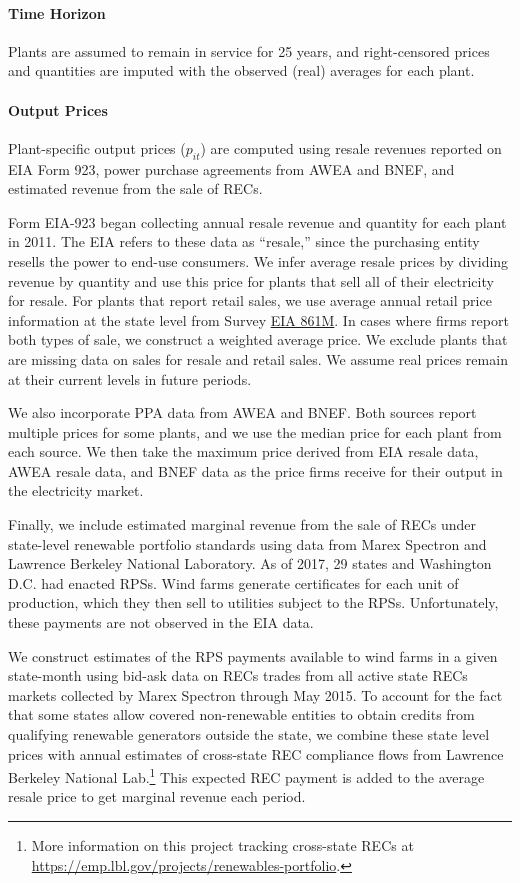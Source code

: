 \documentclass[12pt]{article}
\begin{document}
\paragraph*{Time Horizon}
Plants are assumed to remain in service for 25 years, and right-censored prices and quantities are imputed with the observed (real) averages for each plant.

\paragraph*{Output Prices}

Plant-specific output prices ($p_{it}$) are computed using resale revenues reported on EIA Form 923, power purchase agreements from AWEA and BNEF, and estimated revenue from the sale of RECs.

Form EIA-923 began collecting annual resale revenue and quantity for each plant in 2011. The EIA refers to these data as ``resale,'' since the purchasing entity resells the power to end-use consumers. We infer average resale prices by dividing revenue by quantity and use this price for plants that sell all of their electricity for resale. For plants that report retail sales, we use average annual retail price information at the state level from Survey \href{https://www.eia.gov/electricity/data/eia861m/index.html}{EIA 861M}. In cases where firms report both types of sale, we construct a weighted average price. We exclude plants that are missing data on sales for resale and retail sales. We assume real prices remain at their current levels in future periods.

We also incorporate PPA data from AWEA and BNEF.  Both sources report multiple prices for some plants, and we use the median price for each plant from each source. We then take the maximum price derived from EIA resale data, AWEA resale data, and BNEF data as the price firms receive for their output in the electricity market.

Finally, we include estimated marginal revenue from the sale of RECs under state-level renewable portfolio standards using data from Marex Spectron and Lawrence Berkeley National Laboratory. As of 2017, 29 states and Washington D.C. had enacted RPSs. Wind farms generate certificates for each unit of production, which they then sell to utilities subject to the RPSs. Unfortunately, these payments are not observed in the EIA data.

We construct estimates of the RPS payments available to wind farms in a given state-month using bid-ask data on RECs trades from all active state RECs markets collected by Marex Spectron through May 2015. To account for the fact that some states allow covered non-renewable entities to obtain credits from qualifying renewable generators outside the state, we combine these state level prices with annual estimates of cross-state REC compliance flows from Lawrence Berkeley National Lab.\footnote{More information on this project tracking cross-state RECs at \href{https://emp.lbl.gov/projects/renewables-portfolio}{https://emp.lbl.gov/projects/renewables-portfolio}.} This expected REC payment is added to the average resale price to get marginal revenue each period. 
\end{document}
